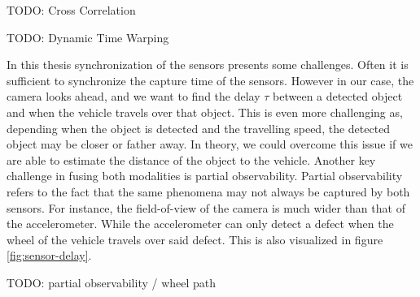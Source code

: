TODO: Cross Correlation

TODO: Dynamic Time Warping

In this thesis synchronization of the sensors presents some challenges. Often it is sufficient to synchronize the capture time of the sensors. However in our case, the camera looks ahead, and we want to find the delay $\tau$ between a detected object and when the vehicle travels over that object. This is even more challenging as, depending when the object is detected and the travelling speed, the detected object may be closer or father away. In theory, we could overcome this issue if we are able to estimate the distance of the object to the vehicle. Another key challenge in fusing both modalities is partial observability. Partial observability refers to the fact that the same phenomena may not always be captured by both sensors. For instance, the field-of-view of the camera is much wider than that of the accelerometer. While the accelerometer can only detect a defect when the wheel of the vehicle travels over said defect. This is also visualized in figure \ref{fig:sensor-delay}.

TODO: partial observability / wheel path


